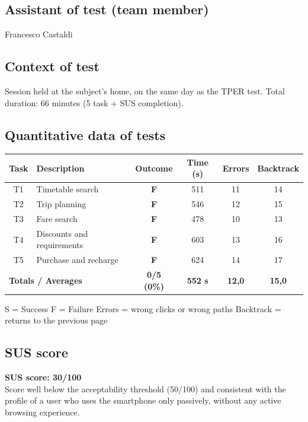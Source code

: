 ﻿\documentclass[11pt,a4paper]{article}
\begin{document}
\subsection*{Assistant of test (team member)}
\begin{tcolorbox}[base]
Francesco Castaldi
\end{tcolorbox}

\subsection*{Context of test}
\begin{tcolorbox}[base]
Session held at the subject's home, on the same day as the TPER test. Total duration: 66 minutes (5 task + SUS completion).
\end{tcolorbox}

\subsection*{Quantitative data of tests}
\begin{tcolorbox}[base]
\begin{center}
\renewcommand{\arraystretch}{1.4}
\begin{tabular}{clcccc}
\toprule
\textbf{Task} & \textbf{Description} &
\textbf{Outcome} & \textbf{Time (s)} &
\textbf{Errors} & \textbf{Backtrack} \\
\midrule
T1 & Timetable search             & \textbf{F} & 511 & 11 & 14 \\
T2 & Trip planning & \textbf{F} & 546 & 12 & 15 \\
T3 & Fare search           & \textbf{F} & 478 & 10 & 13 \\
T4 & Discounts and requirements  & \textbf{F} & 603 & 13 & 16 \\
T5 & Purchase and recharge       & \textbf{F} & 624 & 14 & 17 \\
\midrule
\multicolumn{2}{l}{\textbf{Totals / Averages}} &
\textbf{0/5 (0\%)} & \textbf{552 s} &
\textbf{12,0} & \textbf{15,0} \\
\bottomrule
\end{tabular}
\end{center}
\vspace{0.3cm}
\small S = Success \quad F = Failure \quad Errors = wrong clicks or wrong paths \quad Backtrack = returns to the previous page
\end{tcolorbox}

\subsection*{SUS score}
\begin{tcolorbox}[base]
\textbf{SUS score: 30/100}\\[0.2cm]
\small Score well below the acceptability threshold (50/100) and consistent with the profile of a user who uses the smartphone only passively, without any active browsing experience.
\end{tcolorbox}
\end{document}
